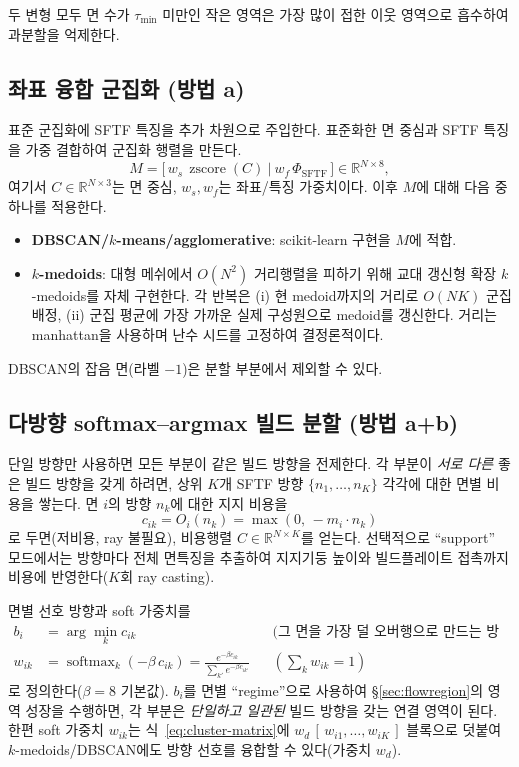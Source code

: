 \documentclass[11pt,a4paper]{article}
\begin{document}
두 변형 모두 면 수가 $\tau_{\min}$ 미만인 작은 영역은
가장 많이 접한 이웃 영역으로 흡수하여 과분할을 억제한다.

\subsection{좌표 융합 군집화 (방법 a)}
\label{sec:cluster}

표준 군집화에 SFTF 특징을 추가 차원으로 주입한다.
표준화한 면 중심과 SFTF 특징을 가중 결합하여 군집화 행렬을 만든다.
\begin{equation}
M
= \big[\, w_s\,\operatorname{zscore}(C)\ \big|\ w_f\,\Phi_{\mathrm{SFTF}}\,\big]
\in\mathbb{R}^{N\times 8},
\label{eq:cluster-matrix}
\end{equation}
여기서 $C\in\mathbb{R}^{N\times3}$는 면 중심, $w_s,w_f$는 좌표/특징 가중치이다.
이후 $M$에 대해 다음 중 하나를 적용한다.
\begin{itemize}
\item \textbf{DBSCAN/$k$-means/agglomerative}: scikit-learn 구현을 $M$에 적합.
\item \textbf{$k$-medoids}: 대형 메쉬에서 $O(N^2)$ 거리행렬을 피하기 위해
교대 갱신형 확장 $k$-medoids를 자체 구현한다.
각 반복은 (i) 현 medoid까지의 거리로 $O(NK)$ 군집 배정,
(ii) 군집 평균에 가장 가까운 실제 구성원으로 medoid를 갱신한다.
거리는 manhattan을 사용하며 난수 시드를 고정하여 결정론적이다.
\end{itemize}
DBSCAN의 잡음 면(라벨 $-1$)은 분할 부분에서 제외할 수 있다.

\subsection{다방향 softmax--argmax 빌드 분할 (방법 a+b)}
\label{sec:multidir}

단일 방향만 사용하면 모든 부분이 같은 빌드 방향을 전제한다.
각 부분이 \emph{서로 다른} 좋은 빌드 방향을 갖게 하려면,
상위 $K$개 SFTF 방향 $\{n_1,\dots,n_K\}$ 각각에 대한 면별 비용을 쌓는다.
면 $i$의 방향 $n_k$에 대한 지지 비용을
\begin{equation}
c_{ik} = O_i(n_k) = \max(0,\,-m_i\cdot n_k)
\end{equation}
로 두면(저비용, ray 불필요), 비용행렬 $C\in\mathbb{R}^{N\times K}$를 얻는다.
선택적으로 ``support'' 모드에서는 방향마다 전체 면특징을 추출하여
지지기둥 높이와 빌드플레이트 접촉까지 비용에 반영한다($K$회 ray casting).

면별 선호 방향과 soft 가중치를
\begin{align}
b_i &= \arg\min_k c_{ik}
   && \text{(그 면을 가장 덜 오버행으로 만드는 방향)}\\
w_{ik} &= \operatorname{softmax}_k(-\beta\, c_{ik})
   = \frac{e^{-\beta c_{ik}}}{\sum_{k'} e^{-\beta c_{ik'}}}
   && (\textstyle\sum_k w_{ik}=1)
\end{align}
로 정의한다($\beta=8$ 기본값).
$b_i$를 면별 ``regime''으로 사용하여 \S\ref{sec:flowregion}의 영역 성장을 수행하면,
각 부분은 \emph{단일하고 일관된} 빌드 방향을 갖는 연결 영역이 된다.
한편 soft 가중치 $w_{ik}$는 식~\eqref{eq:cluster-matrix}에
$w_d\,[\,w_{i1},\dots,w_{iK}\,]$ 블록으로 덧붙여
$k$-medoids/DBSCAN에도 방향 선호를 융합할 수 있다(가중치 $w_d$).
\end{document}
